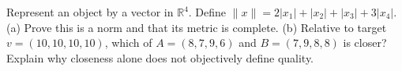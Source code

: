 Represent an object by a vector in $\mathbb R^4$. Define $\|x\|=2|x_1|+|x_2|+|x_3|+3|x_4|$. (a) Prove this is a norm and that its metric is complete. (b) Relative to target $v=(10,10,10,10)$, which of $A=(8,7,9,6)$ and $B=(7,9,8,8)$ is closer? Explain why closeness alone does not objectively define quality.
